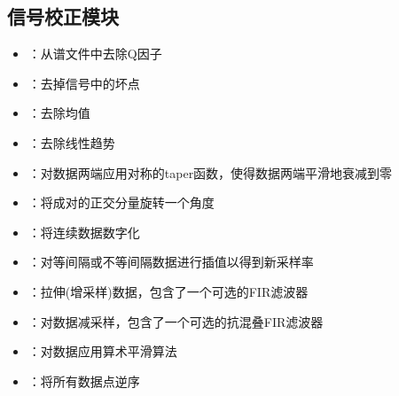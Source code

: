 \subsection*{信号校正模块}
\begin{itemize}
\item {}：从谱文件中去除Q因子
\item {}：去掉信号中的坏点
\item {}：去除均值
\item {}：去除线性趋势
\item {}：对数据两端应用对称的taper函数，使得数据两端平滑地衰减到零
\item {}：将成对的正交分量旋转一个角度
\item {}：将连续数据数字化
\item {}：对等间隔或不等间隔数据进行插值以得到新采样率
\item {}：拉伸(增采样)数据，包含了一个可选的FIR滤波器
\item {}：对数据减采样，包含了一个可选的抗混叠FIR滤波器
\item {}：对数据应用算术平滑算法
\item {}：将所有数据点逆序
\end{itemize}

